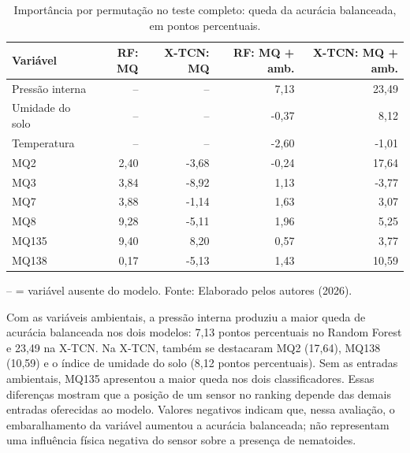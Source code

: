 \begin{table}[htbp]
    \centering
    \caption{Importância por permutação no teste completo: queda da acurácia balanceada, em pontos percentuais.}
    \label{tab:importancia_variaveis_vacuo}
    \scriptsize
    \begin{tabular}{lrrrr}
        \hline
        \textbf{Variável} &
        \textbf{RF: MQ} &
        \textbf{X-TCN: MQ} &
        \textbf{RF: MQ + amb.} &
        \textbf{X-TCN: MQ + amb.} \\
        \hline
        Pressão interna & --    & --    & 7,13  & 23,49 \\
        Umidade do solo & --    & --    & -0,37 & 8,12  \\
        Temperatura     & --    & --    & -2,60 & -1,01 \\
        MQ2             & 2,40  & -3,68 & -0,24 & 17,64 \\
        MQ3             & 3,84  & -8,92 & 1,13  & -3,77 \\
        MQ7             & 3,88  & -1,14 & 1,63  & 3,07  \\
        MQ8             & 9,28  & -5,11 & 1,96  & 5,25  \\
        MQ135           & 9,40  & 8,20  & 0,57  & 3,77  \\
        MQ138           & 0,17  & -5,13 & 1,43  & 10,59 \\
        \hline
    \end{tabular}

    \vspace{0.1cm}
    {\footnotesize -- = variável ausente do modelo. Fonte: Elaborado pelos autores (2026).}
\end{table}

Com as variáveis ambientais, a pressão interna produziu a maior queda de
acurácia balanceada nos dois modelos: 7,13 pontos percentuais no Random Forest
e 23,49 na X-TCN. Na X-TCN, também se destacaram MQ2 (17,64), MQ138 (10,59)
e o índice de umidade do solo (8,12 pontos percentuais). Sem as entradas
ambientais, MQ135 apresentou a maior queda nos dois classificadores. Essas
diferenças mostram que a posição de um sensor no ranking depende das demais
entradas oferecidas ao modelo. Valores negativos indicam que, nessa avaliação,
o embaralhamento da variável aumentou a acurácia balanceada; não representam
uma influência física negativa do sensor sobre a presença de nematoides.

